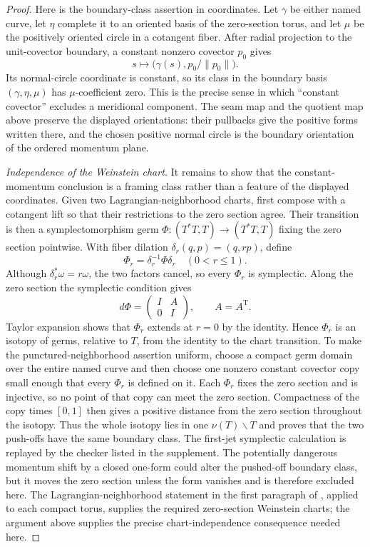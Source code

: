 \documentclass[11pt]{article}
\theoremstyle{definition}
\begin{document}
\begin{proof}
Here is the boundary-class assertion in coordinates.  Let $\gamma$ be either
named curve, let $\eta$ complete it to an oriented basis of the zero-section
torus, and let $\mu$ be the positively oriented circle in a cotangent fiber.
After radial projection to the unit-covector boundary, a constant nonzero
covector $p_0$ gives
\[
 s\longmapsto \bigl(\gamma(s),p_0/\lVert p_0\rVert\bigr).
\]
Its normal-circle coordinate is constant, so its class in the boundary basis
$(\gamma,\eta,\mu)$ has $\mu$-coefficient zero.  This is the precise sense in
which ``constant covector'' excludes a meridional component.  The seam map
and the quotient map above preserve the displayed orientations: their
pullbacks give the positive forms written there, and the chosen positive
normal circle is the boundary orientation of the ordered momentum plane.

\emph{Independence of the Weinstein chart.}  It remains to show that the
constant-momentum conclusion is a framing class rather than a feature of
the displayed coordinates.  Given two Lagrangian-neighborhood charts, first
compose with a cotangent lift so that their restrictions to the zero section
agree.  Their transition is then a symplectomorphism germ
$\Phi:(T^*T,T)\to(T^*T,T)$ fixing the zero section pointwise.  With fiber
dilation $\delta_r(q,p)=(q,rp)$, define
\[
 \Phi_r=\delta_r^{-1}\Phi\delta_r\quad(0<r\leq1).
\]
Although $\delta_r^*\omega=r\omega$, the two factors cancel, so every $\Phi_r$
is symplectic.  Along the zero section the symplectic condition gives
\[
 d\Phi=\begin{pmatrix}I&A\\0&I\end{pmatrix},\qquad A=A^{\mathrm T}.
\]
Taylor expansion shows that $\Phi_r$ extends at $r=0$ by the identity.  Hence
$\Phi_r$ is an isotopy of germs, relative to $T$, from the identity to the
chart transition.  To make the punctured-neighborhood assertion uniform,
choose a compact germ domain over the entire named curve and then choose one
nonzero constant covector copy small enough that every $\Phi_r$ is defined
on it.  Each $\Phi_r$ fixes the zero section and is injective, so no point of
that copy can meet the zero section.  Compactness of the copy times
$[0,1]$ then gives a positive distance from the zero section throughout the
isotopy.  Thus the whole isotopy lies in one
$\nu(T)\smallsetminus T$ and proves that the two push-offs have the same
boundary class.  The first-jet symplectic calculation is replayed by the
checker listed in the supplement.  The potentially dangerous
momentum shift by a closed one-form could alter the pushed-off boundary
class, but it moves the zero section unless the form vanishes and is therefore
excluded here.  The Lagrangian-neighborhood statement in the first paragraph
of \cite[\S2.1]{ADK}, applied to each compact torus, supplies the required
zero-section Weinstein charts; the argument above supplies the precise
chart-independence consequence needed here.
\end{proof}
\end{document}
